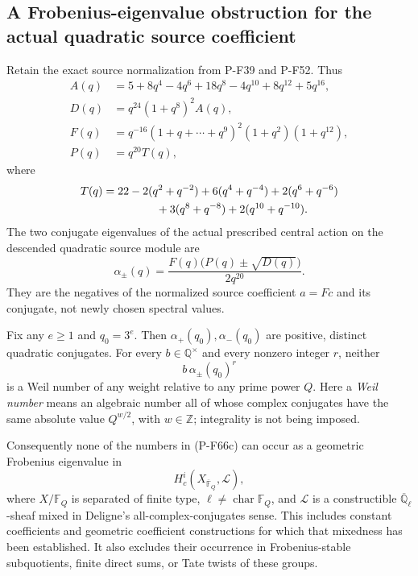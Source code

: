 \subsection{A Frobenius-eigenvalue obstruction for the actual quadratic source coefficient}

\begin{proposition}
\label{prop:nonstandardweileigenvalue}
Retain the exact source normalization from P-F39 and P-F52.  Thus
\[
\begin{split}
 A(q)&=5+8q^4-4q^6+18q^8-4q^{10}+8q^{12}+5q^{16},\\
 D(q)&=q^{24}(1+q^8)^2A(q),\\
 F(q)&=q^{-16}(1+q+\cdots+q^9)^2(1+q^2)(1+q^{12}),\\
 P(q)&=q^{20}T(q),
\end{split}
                                                        \tag{P-F66a}
\]
where
\[
\begin{split}
 T(q)={}&22-2(q^2+q^{-2})+6(q^4+q^{-4})
       +2(q^6+q^{-6})\\
       &\hspace{12mm}+3(q^8+q^{-8})+2(q^{10}+q^{-10}).
\end{split}
\]
The two conjugate eigenvalues of the actual prescribed central action
on the descended quadratic source module are
\[
       \alpha_\pm(q)
         =\frac{F(q)\bigl(P(q)\pm\sqrt{D(q)}\bigr)}{2q^{20}}.
                                                        \tag{P-F66b}
\]
They are the negatives of the normalized source coefficient
$a=Fc$ and its conjugate, not newly chosen spectral values.

Fix any $e\ge1$ and $q_0=3^e$.  Then
$\alpha_+(q_0),\alpha_-(q_0)$ are positive, distinct quadratic
conjugates.  For every $b\in\mathbb Q^\times$ and every nonzero
integer $r$, neither
\[
                         b\,\alpha_\pm(q_0)^r
                                                        \tag{P-F66c}
\]
is a Weil number of any weight relative to any prime power $Q$.
Here a \emph{Weil number} means an algebraic number all of whose
complex conjugates have the same absolute value $Q^{w/2}$,
with $w\in\mathbb Z$; integrality is not being imposed.

Consequently none of the numbers in (P-F66c) can occur as a
geometric Frobenius eigenvalue in
\[
           H_c^i(X_{\overline{\mathbb F}_Q},\mathcal L),
                                                        \tag{P-F66d}
\]
where $X/\mathbb F_Q$ is separated of finite type,
$\ell\ne\operatorname{char}\mathbb F_Q$, and $\mathcal L$
is a constructible $\overline{\mathbb Q}_\ell$-sheaf mixed
in Deligne's all-complex-conjugates sense.  This includes
constant coefficients and geometric coefficient constructions
for which that mixedness has been established.  It also
excludes their occurrence in Frobenius-stable subquotients,
finite direct sums, or Tate twists of these groups.
\end{proposition}

